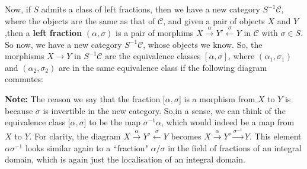 \documentclass[12pt]{article}
\newcommand{\cat}[1]{\mathscr{#1}}
\begin{document}
Now, if $S$ admits a class of left fractions, then we have a new category $S^{-1}\cat{C}$, where the objects are the same as that of $\cat{C}$, and given a pair of objects $X$ and $Y$,then a \textbf{left fraction }$(\alpha,\sigma)$ is a pair of morphims $X\xrightarrow{\alpha}Y'\xleftarrow{\sigma}Y$ in $\cat{C}$ with $\sigma\in S$.\\

So now, we have a new category $S^{-1}\cat{C}$, whose objects we know. So, the morphisms $X \to Y$ in $S^{-1}\cat{C}$ are the equivalence classes $[\alpha,\sigma]$, where $(\alpha_1,\sigma_1)$ and $(\alpha_2,\sigma_2)$ are in the same equivalence class if the following diagram commutes:
\begin{center}
\end{center}

\textbf{Note: } The reason we say that the fraction [$\alpha,\sigma$] is a morphism from $X$ to $Y$ is because $\sigma$ is invertible in the new category. So,in a sense, we can think of the equivalence class [$\alpha,\sigma$] to be the map $\sigma^{-1}\alpha$, which would indeed be a map from $X$ to $Y$. For clarity, the diagram $X\xrightarrow{\alpha}Y'\xleftarrow{\sigma}Y$ becomes $X\xrightarrow{\alpha}Y'\xrightarrow{\sigma^{-1}}Y$. This element $\alpha\sigma^{-1}$ looks similar again to a ``fraction" $\alpha/\sigma$ in the field of fractions of an integral domain, which is again just the localisation of an integral domain. \\
\end{document}

